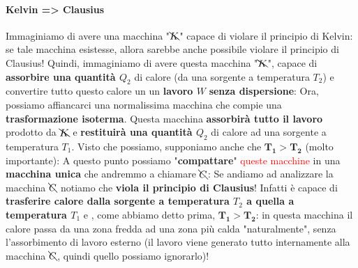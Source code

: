                 \paragraph{Kelvin => Clausius}
                    Immaginiamo di avere una macchina "$\bcancel{K}$" capace di violare il principio di Kelvin: se tale macchina esistesse, allora sarebbe anche possibile violare il principio di Clausius! Quindi, immaginiamo di avere questa macchina "$\bcancel{K}$", capace di \textbf{assorbire una quantità $Q_2$} di calore (da una sorgente a temperatura $T_2$) e convertire tutto questo calore un un \textbf{lavoro $W$} \textbf{senza dispersione}:
                    Ora, possiamo affiancarci una normalissima macchina che compie una \textbf{trasformazione isoterma}. Questa macchina \textbf{assorbirà tutto il lavoro} prodotto da $\bcancel{K}$ e \textbf{restituirà una quantità $Q_2$} di calore ad una sorgente a temperatura $T_1$. Visto che possiamo, supponiamo anche che $\mathbf{T_1>T_2}$ (molto importante):
                    A questo punto possiamo "\textbf{compattare}" \textcolor{Red}{queste macchine} in una \textbf{macchina unica} che andremmo a chiamare $\bcancel{C}$:
                    Se andiamo ad analizzare la macchina $\bcancel{C}$ notiamo che \textbf{viola il principio di Clausius}! Infatti è capace di \textbf{trasferire calore dalla sorgente a temperatura $T_2$ a quella a temperatura $T_1$} e , come abbiamo detto prima, $\mathbf{T_1>T_2}$: in questa macchina il calore passa da una zona fredda ad una zona più calda "naturalmente", senza l'assorbimento di lavoro esterno (il lavoro viene generato tutto internamente alla macchina $\bcancel{C}$, quindi quello possiamo ignorarlo)!

